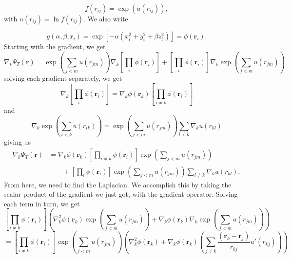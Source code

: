\documentclass[11pt,a4paper,titlepage]{article}
\begin{document}
\begin{equation*}
   f(r_{ij})= \exp{\left(u(r_{ij})\right)},
\end{equation*}
with $u(r_{ij})=\ln{f(r_{ij})}$.
We also write

\begin{equation*}
    g(\alpha,\beta,\mathbf{r}_i) = \exp{\left[-\alpha(x_i^2+y_i^2+\beta
    z_i^2)\right]}= \phi(\mathbf{r}_i).
\end{equation*}
Starting with the gradient, we get
\begin{equation}
  \nabla_k\Psi_T(\mathbf{r}) = \exp{\left(\sum_{j<m}u(r_{jm})\right)}\nabla_k\left[\prod_{i}\phi(\mathbf{r}_i)\right] + \left[\prod_{i}\phi(\mathbf{r}_i)\right]\nabla_k\exp{\left(\sum_{j<m}u(r_{jm})\right)}
\end{equation}
solving each gradient separately, we get
\begin{equation*}
\nabla_k\left[\prod_{i}\phi(\mathbf{r}_i)\right] = \nabla_k\phi(\mathbf{r}_k)\left[\prod_{i\ne k}\phi(\mathbf{r}_i)\right]
\end{equation*}
and 
\begin{equation*}
\nabla_k\exp{\left(\sum_{i<k}u(r_{ik})\right)} = \exp{\left(\sum_{j<m}u(r_{jm})\right)}\sum_{l\ne k}\nabla_k u(r_{kl})
\end{equation*}
giving us 
\begin{align*}
  \nabla_k\Psi_T(\mathbf{r}) &= \nabla_k\phi(\mathbf{r}_k)\left[\prod_{i\ne k}\phi(\mathbf{r}_i)\right]\exp{\left(\sum_{j<m}u(r_{jm})\right)}
  \\
  &\qquad
  +  \left[\prod_i\phi(\mathbf{r}_i)\right]
  \exp{\left(\sum_{j<m}u(r_{jm})\right)}\sum_{l\ne k}\nabla_k u(r_{kl}),
\end{align*}
From here, we need to find the Laplacian. We accomplish this by taking the scalar product of the gradient we just got, with the gradient operator. Solving each term in turn, we get
\begin{equation*}
\left[\prod_{i\ne k}\phi(\mathbf{r}_i)\right]\left( \nabla_k^2\phi(\mathbf{r}_k) \exp{\left(\sum_{j<m}u(r_{jm})\right)} + \nabla_k\phi(\mathbf{r}_k)\nabla_k\exp{\left(\sum_{j<m}u(r_{jm})\right)}\right)
\end{equation*}
\begin{equation*}
= \left[\prod_{i\ne k}\phi(\mathbf{r}_i)\right]\exp{\left(\sum_{j<m}u(r_{jm})\right)}\left( \nabla_k^2\phi(\mathbf{r}_k)  + \nabla_k\phi(\mathbf{r}_k)\left(\sum_{j\ne k}\frac{(\mathbf{r}_k-\mathbf{r}_j)}{r_{kj}}u'(r_{kj})\right)\right)
\end{equation*}
\end{document}
